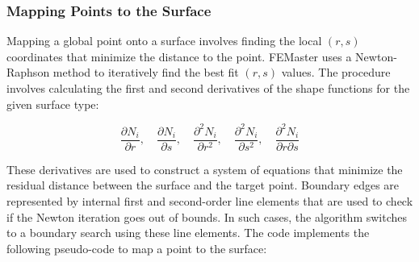 \newpage
\subsubsection{Mapping Points to the Surface}
Mapping a global point onto a surface involves finding the local $(r, s)$ coordinates that minimize the distance to the point. FEMaster uses a Newton-Raphson method to iteratively find the best fit $(r, s)$ values. The procedure involves calculating the first and second derivatives of the shape functions for the given surface type:

\[
\frac{\partial N_i}{\partial r}, \quad \frac{\partial N_i}{\partial s}, \quad \frac{\partial^2 N_i}{\partial r^2}, \quad \frac{\partial^2 N_i}{\partial s^2}, \quad \frac{\partial^2 N_i}{\partial r \partial s}
\]

These derivatives are used to construct a system of equations that minimize the residual distance between the surface and the target point. Boundary edges are represented by internal first and second-order line elements that are used to check if the Newton iteration goes out of bounds. In such cases, the algorithm switches to a boundary search using these line elements.
The code implements the following pseudo-code to map a point to the surface:

